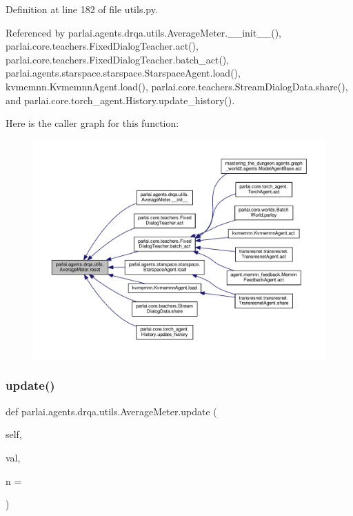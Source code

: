 Definition at line 182 of file utils.\+py.



Referenced by parlai.\+agents.\+drqa.\+utils.\+Average\+Meter.\+\_\+\+\_\+init\+\_\+\+\_\+(), parlai.\+core.\+teachers.\+Fixed\+Dialog\+Teacher.\+act(), parlai.\+core.\+teachers.\+Fixed\+Dialog\+Teacher.\+batch\+\_\+act(), parlai.\+agents.\+starspace.\+starspace.\+Starspace\+Agent.\+load(), kvmemnn.\+Kvmemnn\+Agent.\+load(), parlai.\+core.\+teachers.\+Stream\+Dialog\+Data.\+share(), and parlai.\+core.\+torch\+\_\+agent.\+History.\+update\+\_\+history().

Here is the caller graph for this function\+:
\nopagebreak
\begin{figure}[H]
\begin{center}
\leavevmode
\includegraphics[width=350pt]{classparlai_1_1agents_1_1drqa_1_1utils_1_1AverageMeter_adf03b2f21b820b30c0bf68334bda0b6e_icgraph}
\end{center}
\end{figure}
\mbox{\label{classparlai_1_1agents_1_1drqa_1_1utils_1_1AverageMeter_a5a66f2a884034fcdf004468a980d1318}} 
\subsubsection{\texorpdfstring{update()}{update()}}
{\footnotesize\ttfamily def parlai.\+agents.\+drqa.\+utils.\+Average\+Meter.\+update (\begin{DoxyParamCaption}\item[{}]{self,  }\item[{}]{val,  }\item[{}]{n = {} }\end{DoxyParamCaption})}



